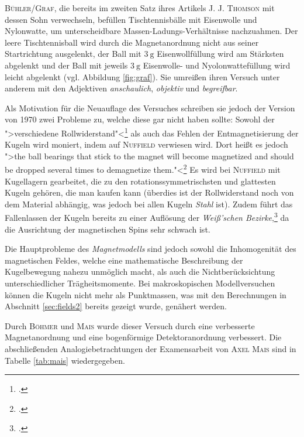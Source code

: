 

\noindent\textsc{Bühler/Graf}, die bereits im zweiten Satz ihres Artikels \textsc{J. J. Thomson} mit dessen Sohn verwechseln, befüllen Tischtennisbälle mit Eisenwolle und Nylonwatte, um unterscheidbare Massen-Ladungs-Verhältnisse nachzuahmen.
Der leere Tischtennisball wird durch die Magnetanordnung nicht aus seiner Startrichtung ausgelenkt, der Ball mit $\SI{3}{\gram}$ Eisenwollfüllung wird am Stärksten abgelenkt und der Ball mit jeweils $\SI{3}{\gram}$ Eisenwolle- und Nyolonwattefüllung wird leicht abgelenkt (vgl. Abbildung \ref{fig:graf}).
Sie umreißen ihren Versuch unter anderem mit den Adjektiven \textit{anschaulich}, \textit{objektiv} und \textit{begreifbar}.


\noindent Als Motivation für die Neuauflage des Versuches schreiben sie jedoch der Version von 1970 zwei Probleme zu, welche diese gar nicht haben sollte: Sowohl der ">verschiedene Rollwiderstand"<\footcite[vgl.][S.\,35]{Graf2002} als auch das Fehlen der Entmagnetisierung der Kugeln wird moniert, indem auf \textsc{Nuffield} verwiesen wird. Dort heißt es jedoch ">the ball bearings that stick to the magnet will become magnetized and should be dropped several times to demagnetize them."<\footcite[S.\,264]{Nuffield1970} Es wird bei \textsc{Nuffield} mit Kugellagern gearbeitet, die zu den rotationssymmetrischsten und glattesten Kugeln gehören, die man kaufen kann (überdies ist der Rollwiderstand noch von dem Material abhängig, was jedoch bei allen Kugeln \textit{Stahl} ist). Zudem führt das Fallenlassen der Kugeln bereits zu einer Auflösung der \textit{Weiß'schen Bezirke},\footcite[vgl.][S.\,13]{Mais2014} da die Ausrichtung der magnetischen Spins sehr schwach ist.


\noindent Die Hauptprobleme des \textit{Magnetmodells} sind jedoch sowohl die Inhomogenität des magnetischen Feldes, welche eine mathematische Beschreibung der Kugelbewegung nahezu unmöglich macht, als auch die Nichtberücksichtung unterschiedlicher Trägheitsmomente. Bei makroskopischen Modellversuchen können die Kugeln nicht mehr als Punktmassen, was mit den Berechnungen in Abschnitt \ref{sec:fields2} bereits gezeigt wurde, genähert werden. 

Durch \textsc{Böhmer} und \textsc{Mais} wurde dieser Versuch durch eine verbesserte Magnetanordnung und eine bogenförmige Detektoranordnung verbessert. Die abschließenden Analogiebetrachtungen der Examensarbeit von \textsc{Axel Mais} sind in Tabelle \ref{tab:mais} wiedergegeben.


